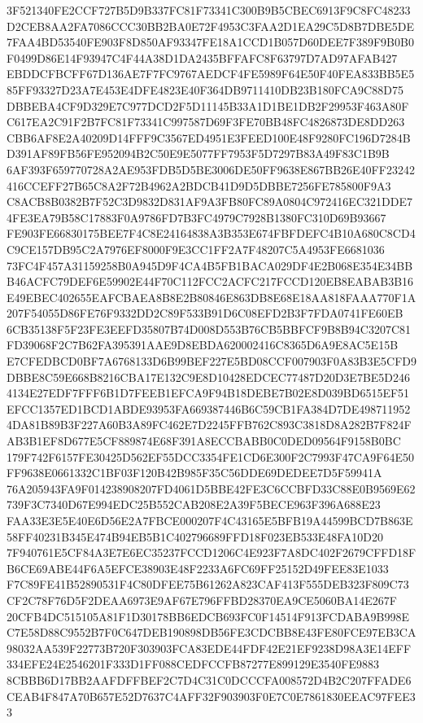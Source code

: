 \documentclass[UTF8,fontset=fandol,zihao=-4,a4paper]{ctexart}
\begin{document}
{{3F521340FE2CCF727B5D9B337FC81F73341C300B9B5CBEC6913F9C8FC48233D2CEB8AA2FA7086CCC30BB2BA0E72F4953C3FAA2D1EA29C5D8B7DBE5DE
7FAA4BD53540FE903F8D850AF93347FE18A1CCD1B057D60DEE7F389F9B0B0F0499D86E14F93947C4F44A38D1DA2435BFFAFC8F63797D7AD97AFAB427
EBDDCFBCFF67D136AE7F7FC9767AEDCF4FE5989F64E50F40FEA833BB5E585FF93327D23A7E453E4DFE4823E40F364DB9711410DB23B180FCA9C88D75
DBBEBA4CF9D329E7C977DCD2F5D11145B33A1D1BE1DB2F29953F463A80FC617EA2C91F2B7FC81F73341C997587D69F3FE70BB48FC4826873DE8DD263
CBB6AF8E2A40209D14FFF9C3567ED4951E3FEED100E48F9280FC196D7284BD391AF89FB56FE952094B2C50E9E5077FF7953F5D7297B83A49F83C1B9B
6AF393F659770728A2AE953FDB5D5BE3006DE50FF9638E867BB26E40FF23242416CCEFF27B65C8A2F72B4962A2BDCB41D9D5DBBE7256FE785800F9A3
C8ACB8B0382B7F52C3D9832D831AF9A3FB80FC89A0804C972416EC321DDE74FE3EA79B58C17883F0A9786FD7B3FC4979C7928B1380FC310D69B93667
FE903FE66830175BEE7F4C8E24164838A3B353E674FBFDEFC4B10A680C8CD4C9CE157DB95C2A7976EF8000F9E3CC1FF2A7F48207C5A4953FE6681036
73FC4F457A31159258B0A945D9F4CA4B5FB1BACA029DF4E2B068E354E34BBB46ACFC79DEF6E59902E44F70C112FCC2ACFC217FCCD120EB8EABAB3B16
E49EBEC402655EAFCBAEA8B8E2B80846E863DB8E68E18AA818FAAA770F1A207F54055D86FE76F9332DD2C89F533B91D6C08EFD2B3F7FDA0741FE60EB
6CB35138F5F23FE3EEFD35807B74D008D553B76CB5BBFCF9B8B94C3207C81FD39068F2C7B62FA395391AAE9D8EBDA620002416C8365D6A9E8AC5E15B
E7CFEDBCD0BF7A6768133D6B99BEF227E5BD08CCF007903F0A83B3E5CFD9DBBE8C59E668B8216CBA17E132C9E8D10428EDCEC77487D20D3E7BE5D246
4134E27EDF7FFF6B1D7FEEB1EFCA9F94B18DEBE7B02E8D039BD6515EF51EFCC1357ED1BCD1ABDE93953FA669387446B6C59CB1FA384D7DE498711952
4DA81B89B3F227A60B3A89FC462E7D2245FFB762C893C3818D8A282B7F824FAB3B1EF8D677E5CF889874E68F391A8ECCBABB0C0DED09564F9158B0BC
179F742F6157FE30425D562EF55DCC3354FE1CD6E300F2C7993F47CA9F64E50FF9638E0661332C1BF03F120B42B985F35C56DDE69DEDEE7D5F59941A
76A205943FA9F014238908207FD4061D5BBE42FE3C6CCBFD33C88E0B9569E62739F3C7340D67E994EDC25B552CAB208E2A39F5BECE963F396A688E23
FAA33E3E5E40E6D56E2A7FBCE000207F4C43165E5BFB19A44599BCD7B863E58FF40231B345E474B94EB5B1C402796689FFD18F023EB533E48FA10D20
7F940761E5CF84A3E7E6EC35237FCCD1206C4E923F7A8DC402F2679CFFD18FB6CE69ABE44F6A5EFCE38903E48F2233A6FC69FF25152D49FEE83E1033
F7C89FE41B52890531F4C80DFEE75B61262A823CAF413F555DEB323F809C73CF2C78F76D5F2DEAA6973E9AF67E796FFBD28370EA9CE5060BA14E267F
20CFB4DC515105A81F1D30178BB6EDCB693FC0F14514F913FCDABA9B998EC7E58D88C9552B7F0C647DEB190898DB56FE3CDCBB8E43FE80FCE97EB3CA
98032AA539F22773B720F303903FCA83EDE44FDF42E21EF9238D98A3E14EFF334EFE24E2546201F333D1FF088CEDFCCFB87277E899129E3540FE9883
8CBBB6D17BB2AAFDFFBEF2C7D4C31C0DCCCFA008572D4B2C207FFADE6CEAB4F847A70B657E52D7637C4AFF32F903903F0E7C0E7861830EEAC97FEE33
}}
\end{document}
